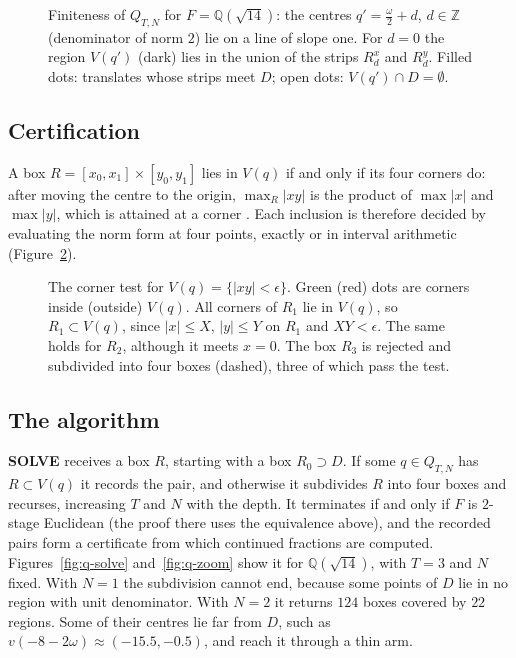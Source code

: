 \documentclass[11pt]{amsart}
\theoremstyle{definition}
\theoremstyle{remark}
\numberwithin{equation}{section}
\newcommand{\Q}{\mathbb{Q}}
\newcommand{\Z}{\mathbb{Z}}
\begin{document}
\begin{figure}[ht]
\centering

\caption{Finiteness of $Q_{T,N}$ for $F=\Q(\sqrt{14})$: the centres $q'=\frac{\omega}{2}+d$,
$d\in\Z$ (denominator of norm $2$) lie on a line of slope one. For $d=0$ the region $V(q')$
(dark) lies in the union of the strips $R^x_d$ and $R^y_d$. Filled dots: translates whose strips
meet $D$; open dots: $V(q')\cap D=\emptyset$.}
\label{fig:q-strips}
\end{figure}

\subsection{Certification} A box $R=[x_0,x_1]\times[y_0,y_1]$ lies in $V(q)$ if and only if its
four corners do: after moving the centre to the origin, $\max_R|xy|$ is the product of
$\max|x|$ and $\max|y|$, which is attained at a corner \cite[Lemma~3.2]{GM}. Each inclusion is
therefore decided by evaluating the norm form at four points, exactly or in interval arithmetic
(Figure~\ref{fig:q-box}).

\begin{figure}[ht]
\centering

\caption{The corner test for $V(q)=\{|xy|<\epsilon\}$. Green (red) dots are corners inside
(outside) $V(q)$. All corners of $R_1$ lie in $V(q)$, so $R_1\subset V(q)$, since $|x|\le X$,
$|y|\le Y$ on $R_1$ and $XY<\epsilon$. The same holds for $R_2$, although it meets $x=0$. The
box $R_3$ is rejected and subdivided into four boxes (dashed), three of which pass the test.}
\label{fig:q-box}
\end{figure}

\subsection{The algorithm} \textbf{SOLVE} receives a box $R$, starting with a box $R_0\supset D$.
If some $q\in Q_{T,N}$ has $R\subset V(q)$ it records the pair, and otherwise it subdivides $R$
into four boxes and recurses, increasing $T$ and $N$ with the depth. It terminates if and
only if $F$ is $2$-stage Euclidean \cite[Theorem~3.4]{GM} (the proof there uses the
equivalence above), and the recorded pairs form a certificate from which continued fractions
are computed. Figures~\ref{fig:q-solve} and~\ref{fig:q-zoom} show
it for $\Q(\sqrt{14})$, with $T=3$ and $N$ fixed. With $N=1$ the subdivision cannot end, because
some points of $D$ lie in no region with unit denominator. With $N=2$ it returns $124$ boxes
covered by $22$ regions. Some of their centres lie far from $D$, such as $v(-8-2\omega)\approx
(-15.5,-0.5)$, and reach it through a thin arm.
\end{document}
